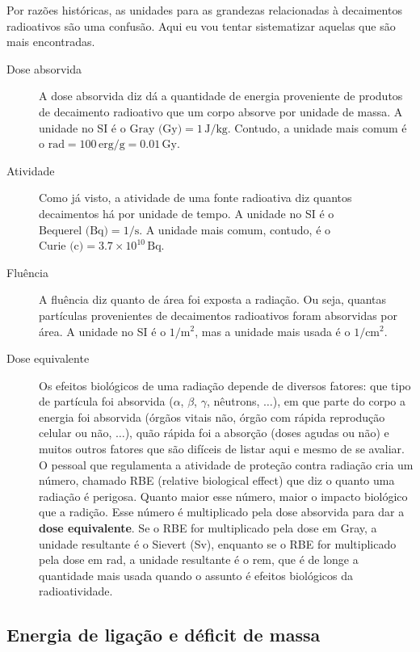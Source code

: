\documentclass{article}
\begin{document}
Por raz\~oes hist\'oricas, as unidades para as grandezas relacionadas \`a decaimentos radioativos s\~ao uma confus\~ao. Aqui eu vou tentar sistematizar aquelas que s\~ao mais encontradas.

\begin{description}
\item[Dose absorvida] A dose absorvida diz d\'a a quantidade de energia proveniente de produtos de decaimento radioativo que um corpo absorve por unidade de massa. A unidade no SI \'e o $\text{Gray (Gy)} = 1\,\text{J/kg}$. Contudo, a unidade mais comum \'e o $\text{rad} = 100\,\text{erg/g} = 0.01\,\text{Gy}$.
\item[Atividade] Como j\'a visto, a atividade de uma fonte radioativa diz quantos decaimentos h\'a por unidade de tempo. A unidade no SI \'e o $\text{Bequerel (Bq)} = 1/\text{s}$. A unidade mais comum, contudo, \'e o $\text{Curie (c)} = 3.7\times 10^{10}\,\text{Bq}$.
\item[Flu\^encia] A flu\^encia diz quanto de \'area foi exposta a radia\c c\~ao. Ou seja, quantas part\'iculas provenientes de decaimentos radioativos foram absorvidas por \'area. A unidade no SI \'e o $1/\text{m}^2$, mas a unidade mais usada \'e o $1/\text{cm}^{2}$.
\item[Dose equivalente] Os efeitos biol\'ogicos de uma radia\c c\~ao depende de diversos fatores: que tipo de part\'icula foi absorvida ($\alpha$, $\beta$, $\gamma$, n\^eutrons, $\ldots$), em que parte do corpo a energia foi absorvida (\'org\~aos vitais n\~ao, \'org\~ao com r\'apida reprodu\c c\~ao celular ou n\~ao, $\ldots$), qu\~ao r\'apida foi a absor\c c\~ao (doses agudas ou n\~ao) e muitos outros fatores que s\~ao dif\'iceis de listar aqui e mesmo de se avaliar. O pessoal que regulamenta a atividade de prote\c c\~ao contra radia\c c\~ao cria um n\'umero, chamado RBE (relative biological effect) que diz o quanto uma radia\c c\~ao \'e perigosa. Quanto maior esse n\'umero, maior o impacto biol\'ogico que a radi\c c\~ao. Esse n\'umero \'e multiplicado pela dose absorvida para dar a \textbf{dose equivalente}. Se o RBE for multiplicado pela dose em Gray, a unidade resultante \'e o Sievert (Sv), enquanto se o RBE for multiplicado pela dose em rad, a unidade resultante \'e o rem, que \'e de longe a quantidade mais usada quando o assunto \'e efeitos biol\'ogicos da radioatividade.
\end{description}

\subsection{Energia de liga\c c\~ao e d\'eficit de massa}
\end{document}
